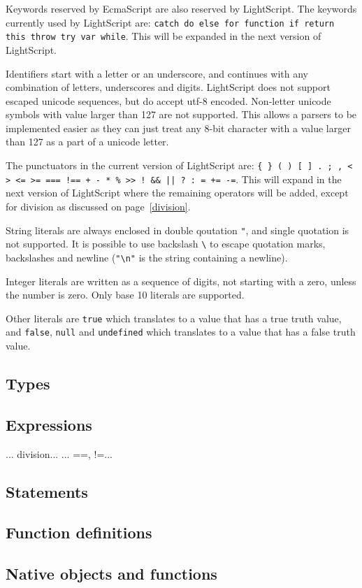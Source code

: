 \documentclass[11pt]{report}
\begin{document}
Keywords reserved by EcmaScript are also reserved by LightScript. The keywords currently used by LightScript are: {\tt catch do else for function if return this throw try var while}. This will be expanded in the next version of LightScript.

Identifiers start with a letter or an underscore, and continues with any combination of letters, underscores and digits. 
LightScript does not support escaped unicode sequences, but do accept utf-8 encoded. Non-letter unicode symbols with value larger than 127 are not supported. This allows a parsers to be implemented easier as they can just treat any 8-bit character with a value larger than 127 as a part of a unicode letter.

The punctuators in the current version of LightScript are: {\tt \verb|{| \verb|}| ( ) [ ] . ; , < > <= >= === !== + - * \% >> ! \&\& || ? : = += -=}. 
This will expand in the next version of LightScript where the remaining operators will be added, except for division as discussed on page~\ref{division}.

String literals are always enclosed in double qoutation \verb|"|, and single quotation is not supported. It is possible to use backslash \verb|\| to escape quotation marks, backslashes and newline (\verb|"\n"| is the string containing a newline).

Integer literals are written as a sequence of digits, not starting with a zero, unless the number is zero. Only base 10 literals are supported.

Other literals are \verb|true| which translates to a value that has a true truth value, and \verb|false|, \verb|null| and \verb|undefined| which translates to a value that has a false truth value.

\subsection{Types}
\subsection{Expressions}
... division... \label{division}
... ==, !=...
\subsection{Statements}
\subsection{Function definitions}
\subsection{Native objects and functions}
\end{document}
